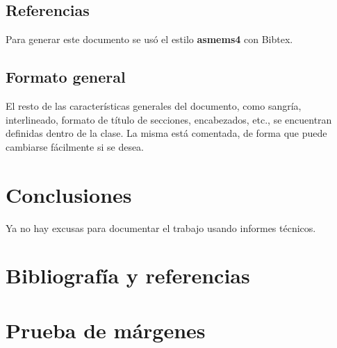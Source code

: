 \documentclass[a4paper,11pt,twoside]{MECOM}
\begin{document}
    
    \subsection{Referencias}
    Para generar este documento se us\'o el estilo {\bf asmems4} con Bibtex.
    
    \subsection{Formato general}
    El resto de las caracter\'isticas generales del documento, como sangr\'ia, interlineado, formato de t\'itulo de secciones, encabezados, etc., se encuentran definidas dentro de la clase. La misma est\'a comentada, de forma que puede cambiarse f\'acilmente si se desea.
    
    
    \section{Conclusiones}
    Ya no hay excusas para documentar el trabajo usando informes t\'ecnicos.
    
    
    \section{Bibliograf\'ia y referencias}
    
    
    
    
    \newpage
    \section{Prueba de m\'argenes} \lipsum[1-12]    
    
\end{document}
